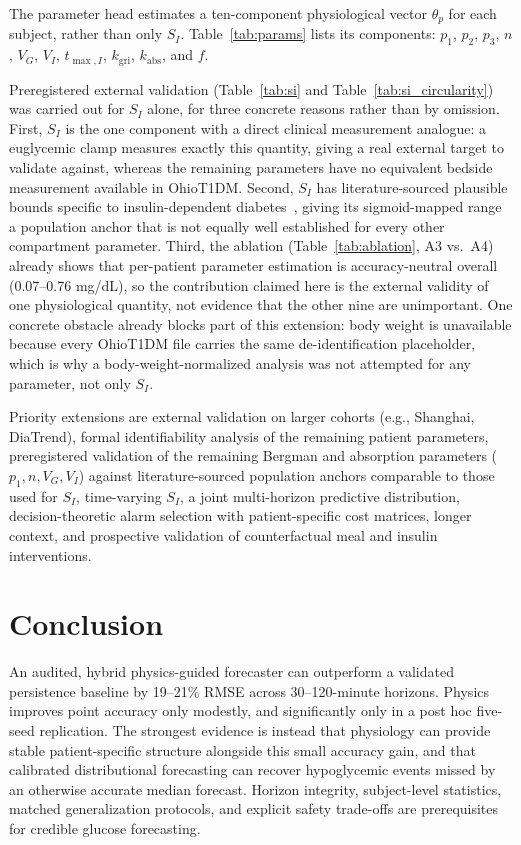 \documentclass[journal]{IEEEtran}
\begin{document}
The parameter head estimates a ten-component physiological vector $\theta_p$ for each subject, rather than only $S_I$. Table~\ref{tab:params} lists its components: $p_1$, $p_2$, $p_3$, $n$, $V_G$, $V_I$, $t_{\max,I}$, $k_{\text{gri}}$, $k_{\text{abs}}$, and $f$.

Preregistered external validation (Table~\ref{tab:si} and Table~\ref{tab:si_circularity}) was carried out for $S_I$ alone, for three concrete reasons rather than by omission. First, $S_I$ is the one component with a direct clinical measurement analogue: a euglycemic clamp measures exactly this quantity, giving a real external target to validate against, whereas the remaining parameters have no equivalent bedside measurement available in OhioT1DM\@. Second, $S_I$ has literature-sourced plausible bounds specific to insulin-dependent diabetes~\cite{ref33}, giving its sigmoid-mapped range a population anchor that is not equally well established for every other compartment parameter. Third, the ablation (Table~\ref{tab:ablation}, A3 vs.\ A4) already shows that per-patient parameter estimation is accuracy-neutral overall (0.07--0.76 mg/dL), so the contribution claimed here is the external validity of one physiological quantity, not evidence that the other nine are unimportant. One concrete obstacle already blocks part of this extension: body weight is unavailable because every OhioT1DM file carries the same de-identification placeholder, which is why a body-weight-normalized analysis was not attempted for any parameter, not only $S_I$.

Priority extensions are external validation on larger cohorts (e.g., Shanghai, DiaTrend), formal identifiability analysis of the remaining patient parameters, preregistered validation of the remaining Bergman and absorption parameters ($p_1, n, V_G, V_I$) against literature-sourced population anchors comparable to those used for $S_I$, time-varying $S_I$, a joint multi-horizon predictive distribution, decision-theoretic alarm selection with patient-specific cost matrices, longer context, and prospective validation of counterfactual meal and insulin interventions.

\section{Conclusion}

An audited, hybrid physics-guided forecaster can outperform a validated persistence baseline by 19--21\% RMSE across 30--120-minute horizons. Physics improves point accuracy only modestly, and significantly only in a post hoc five-seed replication. The strongest evidence is instead that physiology can provide stable patient-specific structure alongside this small accuracy gain, and that calibrated distributional forecasting can recover hypoglycemic events missed by an otherwise accurate median forecast. Horizon integrity, subject-level statistics, matched generalization protocols, and explicit safety trade-offs are prerequisites for credible glucose forecasting.
\end{document}
